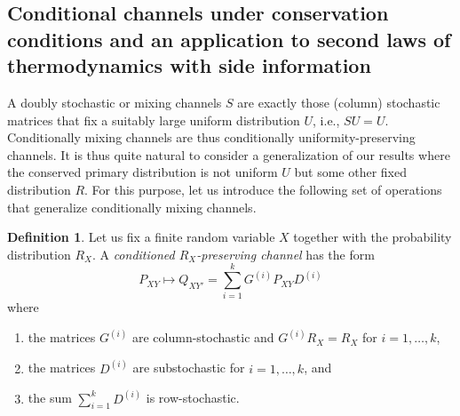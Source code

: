 \documentclass[aps,pra,11pt,onecolumn,nofootinbib,tightenlines]{revtex4-2}
\theoremstyle{definition}
\newtheorem{definition}[theorem]{Definition}
\begin{document}
\subsection{Conditional channels under conservation conditions and an application to second laws of thermodynamics with side information}
\label{sec: second laws of thermo}

A doubly stochastic or mixing channels $S$ are exactly those (column) stochastic matrices that fix a suitably large uniform distribution $U$, i.e., $SU=U$. Conditionally mixing channels are thus conditionally uniformity-preserving channels. It is thus quite natural to consider a generalization of our results where the conserved primary distribution is not uniform $U$ but some other fixed distribution $R$. For this purpose, let us introduce the following set of operations that generalize conditionally mixing channels.

\begin{definition}
Let us fix a finite random variable $X$ together with the probability distribution $R_X$. A \textit{conditioned $R_X$-preserving channel} has the form
\begin{equation}
P_{XY}\mapsto Q_{XY'}=\sum_{i=1}^k G^{(i)}P_{XY}D^{(i)}
\end{equation}
where
\begin{enumerate}
\item the matrices $G^{(i)}$ are column-stochastic and $G^{(i)}R_X=R_X$ for $i=1,\ldots,k$,
\item the matrices $D^{(i)}$ are substochastic for $i=1,\ldots,k$, and
\item the sum $\sum_{i=1}^k D^{(i)}$ is row-stochastic.
\end{enumerate}
\end{definition}
\end{document}

